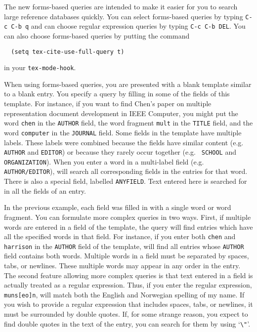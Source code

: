 The new forms-based queries are intended to make it easier for you to
search large reference databases quickly.  You can select forms-based
queries by typing \verb+C-c C-b q+ and can choose regular expression
queries by typing \verb+C-c C-b DEL+.  You can also choose forms-based
queries by putting the command
\begin{verbatim}
  (setq tex-cite-use-full-query t)
\end{verbatim}
in your {\tt tex-mode-hook}.

When using forms-based queries, you are presented with a blank
template similar to a blank {\BM} entry.  You specify a query by
filling in some of the fields of this template.  For instance, if you
want to find Chen's paper on multiple representation document
development in IEEE Computer, you might put the word {\tt chen} in the
{\tt AUTHOR} field, the word fragment {\tt mult} in the {\tt TITLE}
field, and the word {\tt computer} in the {\tt JOURNAL} field.  Some
fields in the template have multiple labels.  These labels were
combined because the fields have similar content (e.g. {\tt AUTHOR}
and {\tt EDITOR}) or because they rarely occur together (e.g. {\tt
SCHOOL} and {\tt ORGANIZATION}).  When you enter a word in a
multi-label field (e.g. {\tt AUTHOR/EDITOR}), {\TM} will search all
corresponding fields in the entries for that word.  There is also a
special field, labelled {\tt ANYFIELD}.  Text entered here is searched
for in all the fields of an entry.

In the previous example, each field was filled in with a single word
or word fragment.  You can formulate more complex queries in two ways.
First, if multiple words are entered in a field of the template, the
query will find entries which have all the specified words in that
field.  For instance, if you enter both {\tt chen} and {\tt harrison}
in the {\tt AUTHOR} field of the template, {\TM} will find all entries
whose {\tt AUTHOR} field contains both words.  Multiple words in a
field must be separated by spaces, tabs, or newlines.  These multiple
words may appear in any order in the entry.  The second feature
allowing more complex queries is that text entered in a field is
actually treated as a regular expression.  Thus, if you enter the
regular expression, {\tt muns[eo]n}, {\TM} will match both the English
and Norwegian spelling of my name.  If you wish to provide a regular
expression that includes spaces, tabs, or newlines, it must be
surrounded by double quotes.  If, for some strange reason, you expect
to find double quotes in the text of the entry, you can search for
them by using `\verb+\"+'.

